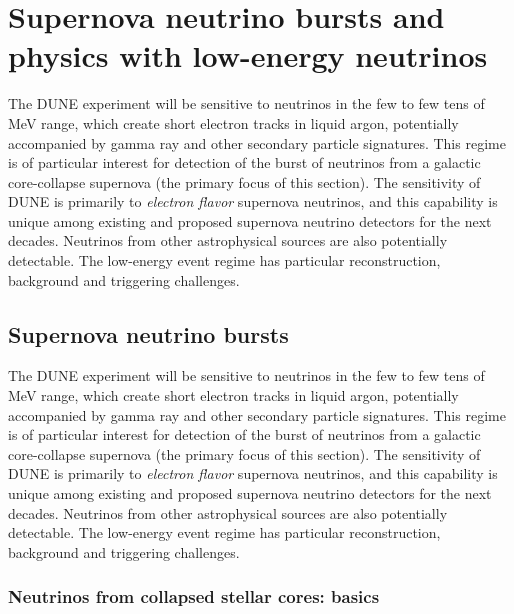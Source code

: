 \chapter{Supernova neutrino bursts and physics with low-energy neutrinos}
\label{ch:snb-lowe}


The DUNE experiment will be sensitive to neutrinos in the few to few
tens of MeV range, which create short electron tracks in liquid argon, potentially accompanied by
gamma ray and other secondary particle signatures.   
This regime is of
particular interest for detection of the burst of neutrinos from a galactic
core-collapse supernova (the primary focus of this section). 
The sensitivity of DUNE is primarily to \textit{electron flavor} supernova neutrinos, and this capability is unique among existing and proposed supernova neutrino detectors for the next decades.  
Neutrinos from other astrophysical sources are also potentially detectable.  
The low-energy event regime has particular reconstruction, background and triggering challenges.



\section{Supernova neutrino bursts}
\label{sec:snb-lowe-snb}


The DUNE experiment will be sensitive to neutrinos in the few to few
tens of MeV range, which create short electron tracks in liquid argon, potentially accompanied by
gamma ray and other secondary particle signatures.   
This regime is of
particular interest for detection of the burst of neutrinos from a galactic
core-collapse supernova (the primary focus of this section). 
The sensitivity of DUNE is primarily to \textit{electron flavor} supernova neutrinos, and this capability is unique among existing and proposed supernova neutrino detectors for the next decades.  
Neutrinos from other astrophysical sources are also potentially detectable.  
The low-energy event regime has particular reconstruction, background and triggering challenges.

\subsection{Neutrinos from collapsed stellar cores: basics}

